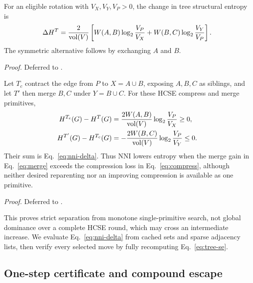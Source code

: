 \begin{theorem}\label{thm:delta}
For an eligible rotation with $V_X,V_Y,V_P>0$, the change in tree structural
entropy is
\begin{equation}
 \Delta H^{T}=
 \frac{2}{\operatorname{vol}(V)}\left[
 W(A,B)\log_2\frac{V_P}{V_X}+
 W(B,C)\log_2\frac{V_Y}{V_P}
 \right].
 \label{eq:nni-delta}
\end{equation}
The symmetric alternative follows by exchanging $A$ and $B$.
\end{theorem}

\emph{Proof.} Deferred to \proofdetails.

\begin{proposition}
\label{prop:atomic}
Let $T_c$ contract the edge from $P$ to $X=A\cup B$, exposing $A,B,C$ as
siblings, and let $T'$ then merge $B,C$ under $Y=B\cup C$. For these HCSE
compress and merge primitives,
\begin{align}
 H^{T_c}(G)-H^T(G)
 &=\frac{2W(A,B)}{\operatorname{vol}(V)}\log_2\frac{V_P}{V_X}\ge0,\label{eq:compress}\\
 H^{T'}(G)-H^{T_c}(G)
 &=-\frac{2W(B,C)}{\operatorname{vol}(V)}\log_2\frac{V_P}{V_Y}\le0.\label{eq:merge}
\end{align}
Their sum is Eq.~\eqref{eq:nni-delta}. Thus NNI lowers entropy when the merge
gain in Eq.~\eqref{eq:merge} exceeds the compression loss in
Eq.~\eqref{eq:compress}, although neither desired reparenting nor an improving
compression is available as one primitive.
\end{proposition}
\emph{Proof.} Deferred to \proofdetails.

This proves strict separation from monotone single-primitive search, not global
dominance over a complete HCSE round, which may cross an intermediate increase.
We evaluate Eq.~\eqref{eq:nni-delta} from cached sets and sparse adjacency lists,
then verify every selected move by fully recomputing Eq.~\eqref{eq:tree-se}.

\subsection{One-step certificate and compound escape}\label{sec:compound-search}
\begin{algorithm}[H]
\caption{Exact NNI refinement of one candidate tree}\label{alg:nni}
\end{algorithm}

